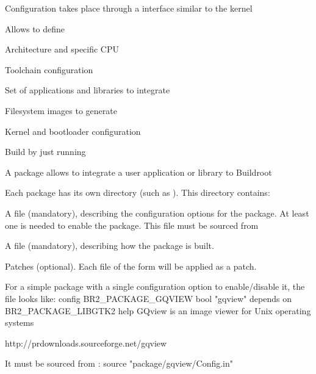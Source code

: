     \startitemize
    \item Configuration takes place through a  interface similar to the
      kernel\\
    \item Allows to define
      \startitemize
      \item Architecture and specific CPU
      \item Toolchain configuration
      \item Set of applications and libraries to integrate
      \item Filesystem images to generate
      \item Kernel and bootloader configuration
      \stopitemize
    \item Build by just running\\
    \stopitemize

  \startitemize
  \item A package allows to integrate a user application or library to
    Buildroot
  \item Each package has its own directory (such as
    ). This directory contains:
    \startitemize
    \item A  file (mandatory), describing the
      configuration options for the package. At least one is needed to
      enable the package. This file must be sourced from
    \item A  file (mandatory), describing how the
      package is built.
    \item Patches (optional). Each file of the form
       will be applied as a patch.
    \stopitemize
  \stopitemize

  \startitemize
  \item For a simple package with a single configuration option to
    enable/disable it, the  file looks like:
\starttyping
config BR2_PACKAGE_GQVIEW
        bool "gqview"
        depends on BR2_PACKAGE_LIBGTK2
        help
          GQview is an image viewer for Unix operating systems

          http://prdownloads.sourceforge.net/gqview
\stoptyping
  \item It must be sourced from :
\starttyping
source "package/gqview/Config.in"
\stoptyping
  \stopitemize

